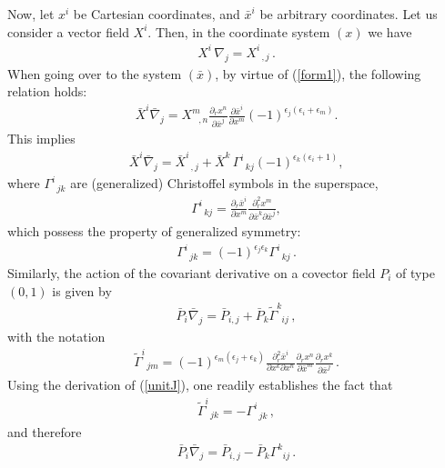 \documentclass[a4paper,11pt]{article}
\begin{document}
Now, let $x^{i}$ be Cartesian coordinates, and ${\bar{x}}^{i}$ be
arbitrary coordinates. Let us consider a vector field $X^{i}$.
Then, in the coordinate
system $(x)$ we have %
\begin{eqnarray}
\nonumber X^i\,{\nabla}_j=X^i_{\;\;,j}\,.
\end{eqnarray}
When going over to the system $({\bar{x}})$, by virtue of (\ref{form1}), the
following relation holds:
\begin{eqnarray}
\nonumber {\bar X}^i{\bar \nabla}_j=
    X^m_{\;\;\,,n}\frac{\partial_r x^n}{\partial {\bar x}^j}
    \frac{\partial {\bar x}^i}{\partial x^m}
    (-1)^{\epsilon_j(\epsilon_i+\epsilon_m)}.
\end{eqnarray}
This implies
\begin{eqnarray}
\nonumber {\bar X}^i{\bar \nabla}_j= {\bar X}^i_{\;\;,j} + {\bar
X}^k\,\Gamma^i_{\;\;kj} (-1)^{\epsilon_k(\epsilon_i+1)},
\end{eqnarray}
where $\Gamma _{\;\;jk}^{i}$ are (generalized) Christoffel symbols in the
superspace,
\begin{eqnarray}
\label{Cris}
\Gamma^i_{\;\;kj}=
\frac{\partial_r {\bar x}^i}{\partial x^m}
\frac{\partial^2_r x^m}{\partial {\bar x}^k\partial {\bar x^j}},
\end{eqnarray}
which possess the property of generalized symmetry:
\begin{eqnarray}
\label{Crisp}
\Gamma^i_{\;\;jk}= (-1)^{\epsilon_j\epsilon_k}\Gamma^i_{\;\;kj}\,.
\end{eqnarray}
Similarly, the action of the covariant derivative on a covector
field $P_{i}$ of type $(0,1)$ is given by
\begin{eqnarray}
\nonumber {\bar P}_i{\bar \nabla}_j= {\bar P}_{i,j} +{\bar
P}_k{\tilde\Gamma}^k_{\;\;ij}\,,
\end{eqnarray}
with the notation
\begin{eqnarray}
\label{Crisp'}
{\tilde\Gamma}^i_{\;\;jm}= (-1)^{\epsilon_m(\epsilon_j+\epsilon_k)}
\frac{\partial^2_r {\bar x}^i}{\partial x^k\partial x^n}
\frac{\partial_r x^n}{\partial {\bar x}^m}
\frac{\partial_r x^k}{\partial {\bar x}^j}\,.
\end{eqnarray}
Using the derivation of (\ref{unitJ}), one readily establishes the fact that
\begin{eqnarray}
\nonumber
{\tilde\Gamma}^i_{\;\;jk}=-\Gamma^i_{\;\;jk}\,,
\end{eqnarray}
and therefore
\begin{eqnarray}
\nonumber {\bar P}_i{\bar \nabla}_j= {\bar P}_{i,j} -{\bar
P}_k\Gamma^k_{\;\;ij}\,.
\end{eqnarray}
\end{document}

